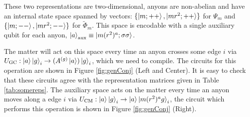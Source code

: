 \documentclass[two column]{article}
\begin{document}
These two representations are two-dimensional, anyons are non-abelian and have an internal state space spanned by vectors: $\{\ket{m; ++}, \ket{mr^2; ++}\}$ for $\Psi_m$ and $\{\ket{m; --}, \ket{mr^2; --}\}$ for $\tilde{\Phi}_m$.
This space is encodable with a single auxiliary qubit for each anyon, $\ket{a}_{\text{aux}} \equiv \ket{m(r^2)^a; \sigma\sigma}$.

The matter will act on this space every time an anyon crosses some edge $i$ via $U_{\text{GC}}: \ket{a}\ket{g}_i \rightarrow (A^{(g)}\ket{a})\ket{g}_i$, which we need to compile.
The circuits for this operation are shown in Figure \ref{fig:genConj} (Left and Center).
It is easy to check that these circuits agree with the representation matrices given in Table \ref{tab:somereps}. 
The auxiliary space acts on the matter every time an anyon moves along a edge $i$ via $U_{\text{CM}}: \ket{a}\ket{g}_i \rightarrow \ket{a}\ket{m(r^2)^a g}_i$, the circuit which performs this operation is shown in Figure \ref{fig:genConj} (Right).
\end{document}
